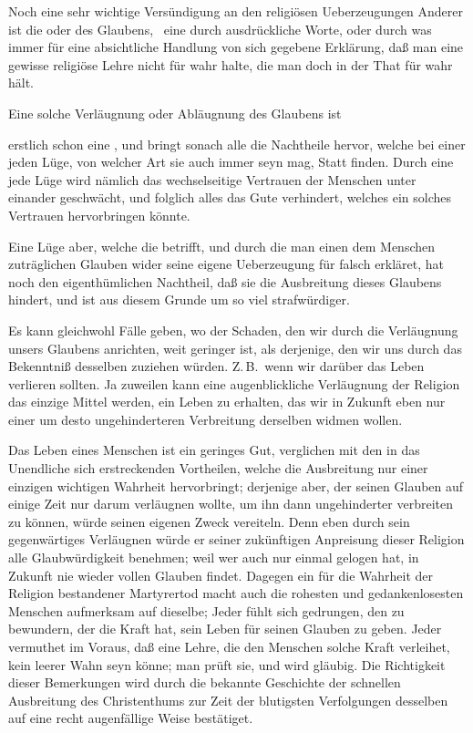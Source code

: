 \begin{aufza} 
\item Noch eine sehr wichtige Versündigung an den religiösen Ueberzeugungen Anderer ist die  oder  des Glaubens, \dh\ eine durch ausdrückliche Worte, oder durch was immer für eine absichtliche Handlung von sich gegebene Erklärung, daß man eine gewisse religiöse Lehre nicht für wahr halte, die man doch in der That für wahr hält.
\item Eine solche Verläugnung oder Abläugnung des Glaubens ist
\begin{aufzb}
\item erstlich schon eine , und bringt sonach alle die Nachtheile hervor, welche bei einer jeden Lüge, von welcher Art sie auch immer seyn mag, Statt finden. Durch eine jede Lüge wird nämlich das wechselseitige Vertrauen der Menschen unter einander geschwächt, und folglich alles das Gute verhindert, welches ein solches Vertrauen hervorbringen könnte.
\item Eine Lüge aber, welche die  betrifft, und durch die man einen dem Menschen zuträglichen Glauben wider seine eigene Ueberzeugung für falsch erkläret, hat noch den eigenthümlichen Nachtheil, daß sie die Ausbreitung dieses Glaubens hindert, und ist aus diesem Grunde um so viel strafwürdiger.
\end{aufzb}
\end{aufza}\par
{} Es kann gleichwohl Fälle geben, wo der Schaden, den wir durch die Verläugnung unsers Glaubens anrichten, weit geringer ist, als derjenige, den wir uns durch das Bekenntniß desselben zuziehen würden. Z.\,B.\ wenn wir darüber das Leben verlieren sollten. Ja zuweilen kann eine augenblickliche Verläugnung der Religion das einzige Mittel werden, ein Leben zu erhalten, das wir in Zukunft eben nur einer um desto ungehinderteren Verbreitung derselben widmen wollen.~\par
{} Das Leben eines Menschen ist ein geringes Gut, verglichen mit den in das Unendliche sich erstreckenden Vortheilen, welche die Ausbreitung nur einer einzigen wichtigen Wahrheit hervorbringt; derjenige aber, der seinen Glauben auf einige Zeit nur darum verläugnen wollte, um ihn dann ungehinderter verbreiten zu können, würde seinen eigenen Zweck vereiteln. Denn eben durch sein gegenwärtiges Verläugnen würde er seiner zukünftigen Anpreisung dieser Religion alle Glaubwürdigkeit benehmen; weil wer auch nur einmal gelogen hat, in Zukunft nie wieder vollen Glauben findet. Dagegen ein für die Wahrheit der Religion bestandener Martyrertod macht auch die rohesten und gedankenlosesten Menschen aufmerksam auf dieselbe; Jeder fühlt sich gedrungen, den zu bewundern, der die Kraft hat, sein Leben für seinen Glauben zu geben. Jeder vermuthet im Voraus, daß eine Lehre, die den Menschen solche Kraft verleihet, kein leerer Wahn seyn könne; man prüft sie, und wird gläubig. Die Richtigkeit dieser Bemerkungen wird durch die bekannte Geschichte der schnellen Ausbreitung des Christenthums zur Zeit der blutigsten Verfolgungen desselben auf eine recht augenfällige Weise bestätiget.
